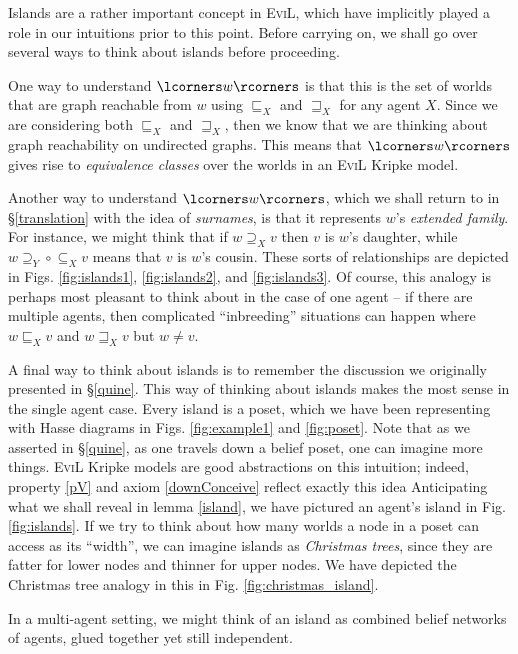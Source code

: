 Islands are a rather important concept in \textsc{EviL}, which have
implicitly played a role in our intuitions prior to this point.
Before carrying on, we shall go over several ways to think about islands
before proceeding. 
\begin{myroman}
\item One way to understand $\lcorners w \rcorners$ is that this is the set
of worlds that are graph reachable from $w$ using $\sqsubseteq_X$ and
$\sqsupseteq_X$ for any agent $X$.  Since we are considering both
$\sqsubseteq_X$ and $\sqsupseteq_X$, then we know that we are thinking
about graph reachability on undirected graphs.
  This means that $\lcorners w
\rcorners$ gives rise to \emph{equivalence classes} over the worlds in
an \textsc{EviL} Kripke model.

\item Another way to understand $\lcorners w \rcorners$, which we shall
return to in \S\ref{translation} with the idea of \emph{surnames}, 
is that it represents $w$'s
\emph{extended family}.  
For instance, we might think that if $w
\supseteq_X v$ then $v$ is $w$'s daughter, while $w \supseteq_Y \circ
\subseteq_X v$ means that $v$ is $w$'s cousin.  These sorts of
relationships are depicted in Figs. \ref{fig:islands1},
\ref{fig:islands2}, and \ref{fig:islands3}.  Of course, this
analogy is perhaps most pleasant to think about 
in the case of one agent -- if there
are multiple agents, then complicated ``inbreeding'' situations 
can happen where $w \sqsubseteq_X v$ and $w \sqsupseteq_X v$ 
but $w \neq v$.

\item\label{thirdway} 
  A final way to think about islands is to remember the discussion
  we originally presented in \S\ref{quine}.  This way of thinking
  about islands makes the most sense in the single agent case.
  Every island is a poset, which we have been representing with Hasse
  diagrams in Figs. \ref{fig:example1} and \ref{fig:poset}.
Note that as we asserted in \S\ref{quine}, as one travels down a
belief poset, one can imagine more things.  \textsc{EviL} Kripke
models are good abstractions on this intuition; indeed, property \ref{pV}
and axiom \ref{downConceive} reflect exactly this idea
Anticipating what we shall reveal in lemma \ref{island}, we have
pictured  an agent's island in Fig. \ref{fig:islands}.  If we try to
think about how many worlds a node in a poset can access as its
``width'', we can imagine islands as \emph{Christmas trees}, since
they are fatter for lower nodes and thinner for upper nodes. 
We have depicted the Christmas tree analogy in this in Fig. \ref{fig:christmas_island}.

  In a multi-agent setting, we might think of an island as combined belief
  networks of agents, glued together yet still independent.
\end{myroman}

